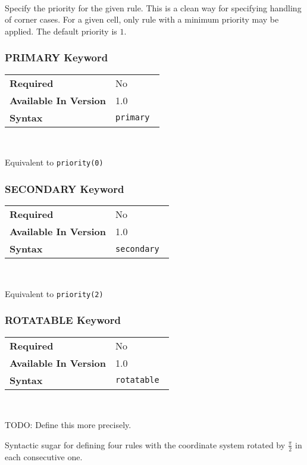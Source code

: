 \documentclass[11pt]{article}
\begin{document}
~

\noindent Specify the priority for the given rule.  This is a clean way for
specifying handling of corner cases.  For a given cell, only rule with a
minimum priority may be applied.  The default priority is $1$.

\subsubsection{PRIMARY Keyword}
\begin{tabular}{| l | l |}
\hline
\bf Required & No                          \\
\bf Available In Version & 1.0             \\
\bf Syntax & \tt primary             \\
\hline
\end{tabular}

~

\noindent Equivalent to {\tt priority(0)}

\subsubsection{SECONDARY Keyword}
\begin{tabular}{| l | l |}
\hline
\bf Required & No                          \\
\bf Available In Version & 1.0             \\
\bf Syntax & \tt secondary \\
\hline
\end{tabular}

~

\noindent Equivalent to {\tt priority(2)}

\subsubsection{ROTATABLE Keyword}
\begin{tabular}{| l | l |}
\hline
\bf Required & No                          \\
\bf Available In Version & 1.0             \\
\bf Syntax & \tt rotatable \\
\hline
\end{tabular}

~

TODO: Define this more precisely.

\noindent Syntactic sugar for defining four rules with the coordinate 
system rotated by $\frac \pi 2$ in each consecutive one.
\end{document}

